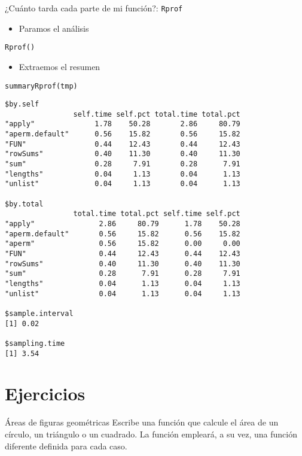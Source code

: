 \documentclass[xcolor={usenames,svgnames,dvipsnames}]{beamer}
\begin{document}
\begin{frame}[label={sec:org4222e4c},fragile]{¿Cuánto tarda cada parte de mi función?: \texttt{Rprof}}
 \begin{itemize}
\item Paramos el análisis
\end{itemize}
\lstset{language=r,label= ,caption= ,captionpos=b,numbers=none}
\begin{lstlisting}
Rprof()
\end{lstlisting}

\begin{itemize}
\item Extraemos el resumen
\end{itemize}
\lstset{language=r,label= ,caption= ,captionpos=b,numbers=none}
\begin{lstlisting}
summaryRprof(tmp)
\end{lstlisting}

\begin{verbatim}
$by.self
                self.time self.pct total.time total.pct
"apply"              1.78    50.28       2.86     80.79
"aperm.default"      0.56    15.82       0.56     15.82
"FUN"                0.44    12.43       0.44     12.43
"rowSums"            0.40    11.30       0.40     11.30
"sum"                0.28     7.91       0.28      7.91
"lengths"            0.04     1.13       0.04      1.13
"unlist"             0.04     1.13       0.04      1.13

$by.total
                total.time total.pct self.time self.pct
"apply"               2.86     80.79      1.78    50.28
"aperm.default"       0.56     15.82      0.56    15.82
"aperm"               0.56     15.82      0.00     0.00
"FUN"                 0.44     12.43      0.44    12.43
"rowSums"             0.40     11.30      0.40    11.30
"sum"                 0.28      7.91      0.28     7.91
"lengths"             0.04      1.13      0.04     1.13
"unlist"              0.04      1.13      0.04     1.13

$sample.interval
[1] 0.02

$sampling.time
[1] 3.54
\end{verbatim}
\end{frame}

\section{Ejercicios}
\label{sec:org3292dd1}
\begin{frame}[label={sec:orgccd7ab2}]{Áreas de figuras geométricas}
Escribe una función que calcule el área de un círculo, un triángulo o un cuadrado. La función empleará, a su vez, una función diferente definida para cada caso.
\end{frame}
\end{document}
